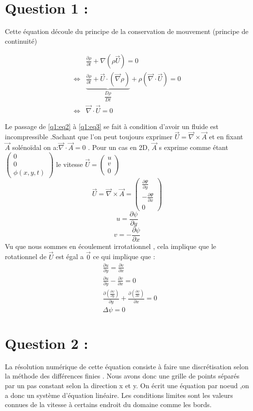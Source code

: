 \documentclass{article}
\newcommand{\pd}[2]{\frac{\partial #1}{\partial #2}}
\begin{document}
\section*{Question 1 :}
Cette équation découle du principe de la conservation de mouvement (principe de continuité)
\begin{center}
\begin{align}
&\pd{\rho}{t}+ \nabla \left(\rho \vec{U} \right)=0 \label{q1:eq1}\\
\iff&\underbrace{\pd{\rho}{t}+\vec{U}\cdot\left(\vec{\nabla}\rho\right)}_{\dfrac{D\rho}{Dt}} + \rho \left(\vec{\nabla}\cdot \vec{U}\right)=0 \label{q1:eq2}\\
\iff&\vec{\nabla} \cdot \vec{U}=0 \label{q1:eq3}
\end{align}
\end{center}
Le passage de \ref{q1:eq2} à \ref{q1:eq3} se fait à condition d'avoir un fluide est incompressible .Sachant que l'on peut toujours exprimer $\vec{U}=\vec{\nabla} \times \vec{A}$ et en fixant $\vec{A}$ solénoïdal on a:$\vec{\nabla} \cdot \vec{A} = 0 $ .
Pour un cas en 2D, $\vec{A}$ s exprime comme étant $\begin{pmatrix}0\\0\\\phi(x,y,t)\end{pmatrix}$
le vitesse $\vec{U}=\begin{pmatrix}u\\v\\0\end{pmatrix}$
 $$\vec{U}=\vec{\nabla} \times \vec{A} =\begin{pmatrix} \pd{\Psi}{y} \\-\pd{\Psi}{x} \\0\end{pmatrix}$$
 $$u=\pd{\psi}{y}$$
 $$v=-\pd{\psi}{x}$$
Vu que nous sommes en écoulement irrotationnel , cela implique que le rotationnel de $\vec{U}$ est égal a $\vec{0}$
ce qui implique que :
\begin{align*}
    &\pd{u}{y}=\pd{v}{x}\\
    &\pd{u}{y}-\pd{v}{x}=0\\
    &\pd{(\pd{\psi}{y})}{y}+\pd{(\pd{\psi}{x})}{x}=0\\
    &\Delta\psi=0
\end{align*}


\section*{Question 2 :}
La résolution numérique de cette équation consiste à faire une discrétisation selon la méthode des différences finies . Nous avons donc une grille de points séparés par un pas constant selon la direction x et y. On écrit une équation par noeud ,on a donc un système d'équation linéaire. Les conditions limites sont les valeurs connues de la vitesse à certains endroit du domaine comme les bords. 
\end{document}
